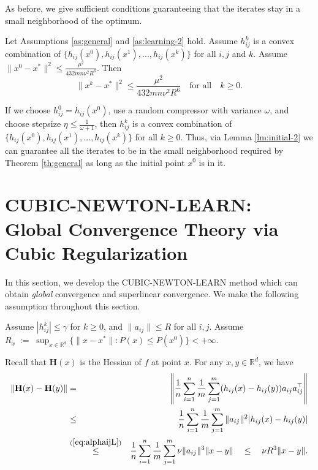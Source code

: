 \documentclass[10pt]{article}
\newcommand{\eqdef}{\; { := }\;}
\newcommand{\R}{\mathbb{R}}
\newcommand{\newalpha}{h}
\newcommand{\mH}{\mathbf{H}}
\begin{document}
As before, we give sufficient conditions guaranteeing that the iterates stay in a small neighborhood of the optimum.
\begin{lemma}\label{lm:initial-2}
	Let Assumptions \ref{as:general} and \ref{as:learning-2} hold. Assume $h_{ij}^k$ is a convex combination of $\{  \newalpha_{ij}(x^0), \newalpha_{ij}(x^1), ..., \newalpha_{ij}(x^k)  \}$ for all $i,j$ and $k$. Assume $\|x^0 - x^*\|^2 \leq \frac{\mu^2}{432mn \nu^2R^6}$. Then 	$$
	\|x^k - x^*\|^2 \leq \frac{\mu^2}{432mn \nu^2R^6} \quad \text{for all} \quad k\geq 0. $$
\end{lemma}


If we choose $h_{ij}^0 = \newalpha_{ij}(x^0)$, use a random  compressor with variance $\omega$, and choose stepsize $\eta \leq \frac{1}{\omega + 1}$, then $h_{ij}^k$ is a convex combination of $\{  \newalpha_{ij}(x^0), \newalpha_{ij}(x^1), ..., \newalpha_{ij}(x^k)  \}$ for all $k\geq 0$. Thus, via Lemma \ref{lm:initial-2} we can guarantee all the iterates to be in the small neighborhood required by Theorem \ref{th:general} as long as the initial point $x^0$ is in it.  





\section{{\sf CUBIC-NEWTON-LEARN}: Global Convergence Theory via Cubic Regularization} \label{sec:CUBIC-NEWTON-LEARN}



In this section, we develop the {\sf CUBIC-NEWTON-LEARN} method which can obtain {\em global} convergence and superlinear convergence.  We make the following assumption throughout this section.

\begin{assumption}\label{as:cubic}
	Assume $|h_{ij}^k| \leq \gamma$ for $k\geq 0$, and $\|a_{ij}\| \leq R$ for all $i,j$. Assume $R_x \eqdef \sup_{x\in \R^d} \{  \|x-x^*\| : P(x) \leq P(x^0)  \} < + \infty$. 
\end{assumption}


Recall that $\mH(x)$ is the Hessian of $f$ at point $x$. For any $x, y \in \R^d$, we have 
\begin{eqnarray*}
\|\mH(x) - \mH(y)\|	&= & \left\| \frac{1}{n} \sum \limits_{i=1}^n \frac{1}{m} \sum\limits_{j=1}^{m}( \newalpha_{ij}(x) - \newalpha_{ij}(y) )a_{ij}a_{ij}^\top  \right\| \\ 
&\leq & \frac{1}{n} \sum\limits_{i=1}^n \frac{1}{m} \sum\limits_{j=1}^{m} \|a_{ij}\|^2 |\newalpha_{ij}(x) - \newalpha_{ij}(y)| \\ 
&\overset{(\ref{eq:alphaijL})}{\leq} & \frac{1}{n} \sum\limits_{i=1}^n \frac{1}{m} \sum\limits_{j=1}^{m} \nu \|a_{ij}\|^3 \|x-y\| \quad \leq \quad \nu R^3 \|x-y\|. 
\end{eqnarray*}
\end{document}
